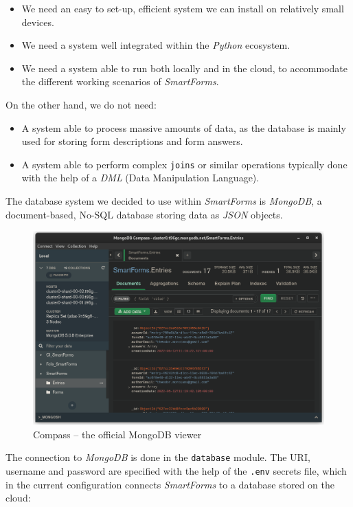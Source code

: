 \documentclass[11pt, a4paper]{report}
\def\code#1{\texttt{#1}}
\begin{document}
\begin{itemize}
    \item We need an easy to set-up, efficient system we can install on relatively small devices.
    \item We need a system well integrated within the \textit{Python} ecosystem.
    \item We need a system able to run both locally and in the cloud, to accommodate the different working scenarios of \textit{SmartForms}.
\end{itemize}

On the other hand, we do not need:
\begin{itemize}
    \item A system able to process massive amounts of data, as the database is mainly used for storing form descriptions and form answers.
    \item A system able to perform complex \code{joins} or similar operations typically done with the help of a \textit{DML} (Data Manipulation Language). 
\end{itemize}

The database system we decided to use within \textit{SmartForms} is \textit{MongoDB}, a document-based, No-SQL database storing data as \textit{JSON} objects.


\begin{figure}[!h]
    \centering
    \includegraphics[width=35em]{images/screenshoots/mongo-compas.png}
    \caption{Compass -- the official MongoDB viewer}
    \label{fig:label}
\end{figure}

The connection to \textit{MongoDB} is done in the \code{database} module. The URI, username and password are specified with the help of the \code{.env} secrets file, which in the current configuration connects \textit{SmartForms} to a database stored on the cloud:
\end{document}
